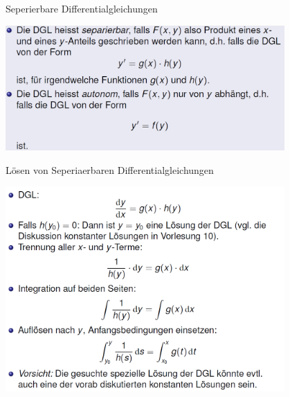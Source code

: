 \begin{definition}{Seperierbare Differentialgleichungen}\\
  \begin{centering}
  \includegraphics[width=0.8\textwidth]{images/2024-06-02-22-13-39.png}\\
  \end{centering}
\end{definition}
\begin{KR}{Lösen von Seperiaerbaren Differentialgleichungen}\\
  \begin{centering}
  \includegraphics[width=0.8\textwidth]{images/2024-06-02-22-15-44.png}\\
  \end{centering}
\end{KR}
